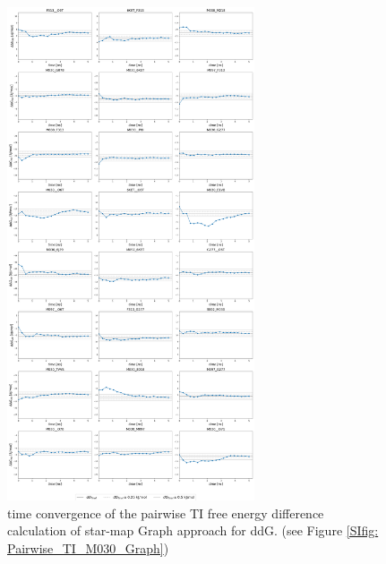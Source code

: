 \begin{figure}
    \centering
    \includegraphics[width=0.65\textwidth]{fig/SI/dG_convergence/ddG_TI_convergence.png}
    \caption{time convergence of the pairwise TI free energy difference calculation of star-map Graph approach for ddG. (see Figure \ref{SIfig: Pairwise_TI_M030_Graph})}
    \label{fig: SI_figure df_convergence_TI}
\end{figure}
